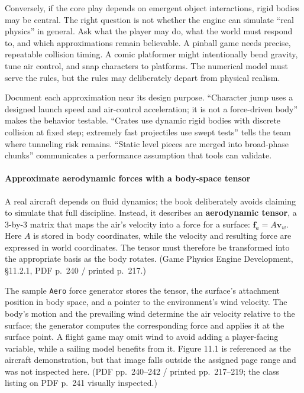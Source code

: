 Conversely, if the core play depends on emergent object interactions, rigid bodies may be central. The right question is not whether the engine can simulate ``real physics'' in general. Ask what the player may do, what the world must respond to, and which approximations remain believable. A pinball game needs precise, repeatable collision timing. A comic platformer might intentionally bend gravity, tune air control, and snap characters to platforms. The numerical model must serve the rules, but the rules may deliberately depart from physical realism.

Document each approximation near its design purpose. ``Character jump uses a designed launch speed and air-control acceleration; it is not a force-driven body'' makes the behavior testable. ``Crates use dynamic rigid bodies with discrete collision at fixed step; extremely fast projectiles use swept tests'' tells the team where tunneling risk remains. ``Static level pieces are merged into broad-phase chunks'' communicates a performance assumption that tools can validate.

\paragraph{Approximate aerodynamic forces with a body-space tensor}\label{06-engine-ii-ch033-approximate-aerodynamic-forces-with-a-body-space-tensor}

\hypertarget{06-engine-ii-ch033-approximate-aerodynamic-forces-with-a-body-space-tensor}{}

A real aircraft depends on fluid dynamics; the book deliberately avoids claiming to simulate that full discipline. Instead, it describes an \textbf{aerodynamic tensor}, a 3-by-3 matrix that maps the air's velocity into a force for a surface: \(\mathbf{f}_a = A\mathbf{v}_w\). Here \(A\) is stored in body coordinates, while the velocity and resulting force are expressed in world coordinates. The tensor must therefore be transformed into the appropriate basis as the body rotates. (Game Physics Engine Development, §11.2.1, PDF p.~240 / printed p.~217.)

The sample \texttt{Aero} force generator stores the tensor, the surface's attachment position in body space, and a pointer to the environment's wind velocity. The body's motion and the prevailing wind determine the air velocity relative to the surface; the generator computes the corresponding force and applies it at the surface point. A flight game may omit wind to avoid adding a player-facing variable, while a sailing model benefits from it. Figure 11.1 is referenced as the aircraft demonstration, but that image falls outside the assigned page range and was not inspected here. (PDF pp.~240--242 / printed pp.~217--219; the class listing on PDF p.~241 visually inspected.)

